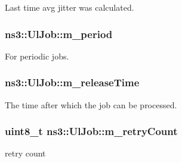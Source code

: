 Last time avg jitter was calculated. 

\subsubsection[{\texorpdfstring{m\+\_\+period}{m_period}}]{ ns3\+::\+Ul\+Job\+::m\+\_\+period\hspace{0.3cm}{\ttfamily [private]}}\hypertarget{classns3_1_1UlJob_ae4dd7227f82b38f532e4401509b2cb47}{}\label{classns3_1_1UlJob_ae4dd7227f82b38f532e4401509b2cb47}


For periodic jobs. 

\subsubsection[{\texorpdfstring{m\+\_\+release\+Time}{m_releaseTime}}]{ ns3\+::\+Ul\+Job\+::m\+\_\+release\+Time\hspace{0.3cm}{\ttfamily [private]}}\hypertarget{classns3_1_1UlJob_a95de87b74e22b9fac4384c6c6ca27b6a}{}\label{classns3_1_1UlJob_a95de87b74e22b9fac4384c6c6ca27b6a}


The time after which the job can be processed. 

\subsubsection[{\texorpdfstring{m\+\_\+retry\+Count}{m_retryCount}}]{\setlength{\rightskip}{0pt plus 5cm}uint8\+\_\+t ns3\+::\+Ul\+Job\+::m\+\_\+retry\+Count\hspace{0.3cm}{\ttfamily [private]}}\hypertarget{classns3_1_1UlJob_ac9c366964a6bb6620719e04a2b705ae0}{}\label{classns3_1_1UlJob_ac9c366964a6bb6620719e04a2b705ae0}


retry count 


